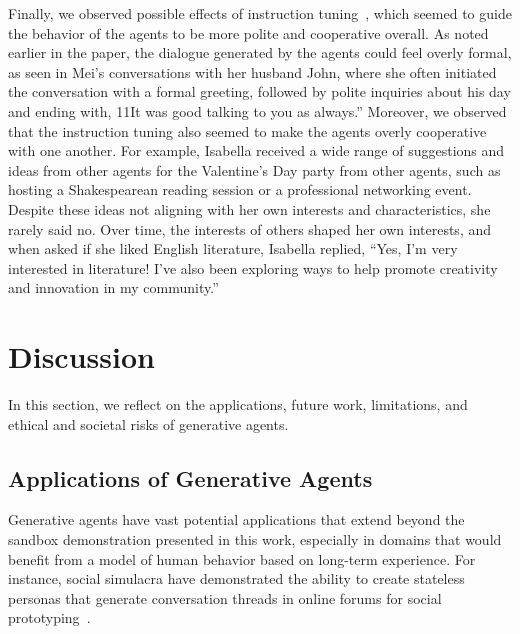 Finally, we observed possible effects of instruction tuning~\cite{ouyang2022training}, which seemed to guide the behavior of the agents to be more polite and cooperative overall. As noted earlier in the paper, the dialogue generated by the agents could feel overly formal, as seen in Mei's conversations with her husband John, where she often initiated the conversation with a formal greeting, followed by polite inquiries about his day and ending with, {\color{darkgray}\small\fontfamily{}\selectfont
11It was good talking to you as always.''} Moreover, we observed that the instruction tuning also seemed to make the agents overly cooperative with one another. For example, Isabella received a wide range of suggestions and ideas from other agents for the Valentine's Day party from other agents, such as hosting a Shakespearean reading session or a professional networking event. Despite these ideas not aligning with her own interests and characteristics, she rarely said no. Over time, the interests of others shaped her own interests, and when asked if she liked English literature, Isabella replied, {\color{darkgray}\small\fontfamily{}\selectfont
``Yes, I'm very interested in literature! I've also been exploring ways to help promote creativity and innovation in my community.''} 

\section{Discussion}
In this section, we reflect on the applications, future work, limitations, and ethical and societal risks of generative agents.

\subsection{Applications of Generative Agents} Generative agents have vast potential applications that extend beyond the sandbox demonstration presented in this work, especially in domains that would benefit from a model of human behavior based on long-term experience. For instance, social simulacra have demonstrated the ability to create stateless personas that generate conversation threads in online forums for social prototyping~\cite{9_park2022socialsimulacra}. {}

